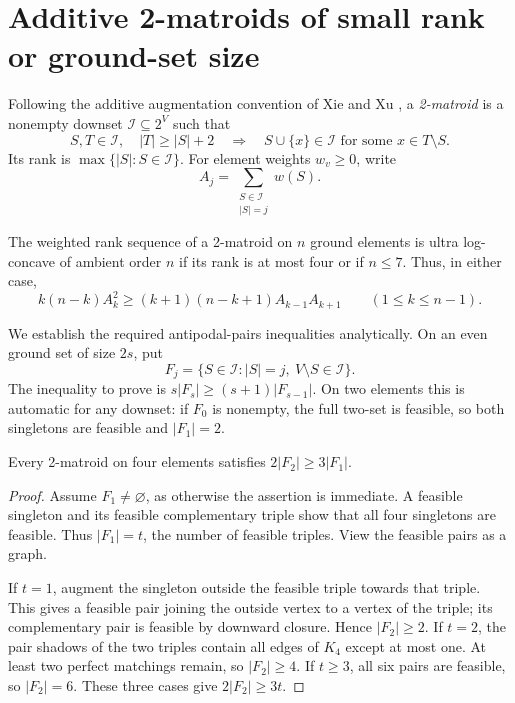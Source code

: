 \section{Additive 2-matroids of small rank or ground-set size}
\label{sec:two-matroid}

Following the additive augmentation convention of Xie and Xu \cite{XX}, a
\emph{2-matroid} is a nonempty downset $\mathcal I\subseteq2^V$ such that
\begin{equation}\label{eq:two-augmentation}
S,T\in\mathcal I,\quad |T|\ge |S|+2
\quad\Longrightarrow\quad
S\cup\{x\}\in\mathcal I\text{ for some }x\in T\setminus S.
\end{equation}
Its rank is $\max\{|S|:S\in\mathcal I\}$. For element weights $w_v\ge0$, write
\[
A_j=\sum_{\substack{S\in\mathcal I\\|S|=j}}w(S).
\]

\begin{theorem}\label{thm:two-matroid-small}
The weighted rank sequence of a 2-matroid on $n$ ground elements is ultra
log-concave of ambient order $n$ if its rank is at most four or if $n\le7$.
Thus, in either case,
\[
k(n-k)A_k^2\ge(k+1)(n-k+1)A_{k-1}A_{k+1}
\qquad(1\le k\le n-1).
\]
\end{theorem}

We establish the required antipodal-pairs inequalities analytically. On an
even ground set of size $2s$, put
\[
F_j=\{S\in\mathcal I:|S|=j,\ V\setminus S\in\mathcal I\}.
\]
The inequality to prove is $s|F_s|\ge(s+1)|F_{s-1}|$. On two elements this is
automatic for any downset: if $F_0$ is nonempty, the full two-set is feasible,
so both singletons are feasible and $|F_1|=2$.

\begin{lemma}\label{lem:two-matroid-four}
Every 2-matroid on four elements satisfies $2|F_2|\ge3|F_1|$.
\end{lemma}
\begin{proof}
Assume $F_1\ne\varnothing$, as otherwise the assertion is immediate. A
feasible singleton and its feasible complementary triple show that all four
singletons are feasible. Thus $|F_1|=t$, the number of feasible triples.
View the feasible pairs as a graph.

If $t=1$, augment the singleton outside the feasible triple towards that
triple. This gives a feasible pair joining the outside vertex to a vertex
of the triple; its complementary pair is feasible by downward closure.
Hence $|F_2|\ge2$. If $t=2$, the pair shadows of the two triples contain
all edges of $K_4$ except at most one. At least two perfect matchings remain,
so $|F_2|\ge4$. If $t\ge3$, all six pairs are feasible, so $|F_2|=6$.
These three cases give $2|F_2|\ge3t$.
\end{proof}

